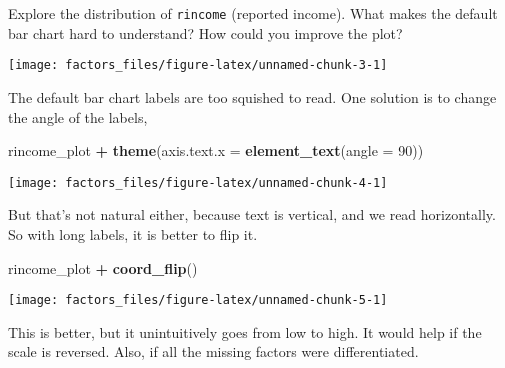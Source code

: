 \documentclass[]{book}
\newenvironment{Shaded}{\begin{snugshade}}{\end{snugshade}}
\newcommand{\DataTypeTok}[1]{\textcolor[rgb]{0.13,0.29,0.53}{#1}}
\newcommand{\DecValTok}[1]{\textcolor[rgb]{0.00,0.00,0.81}{#1}}
\newcommand{\KeywordTok}[1]{\textcolor[rgb]{0.13,0.29,0.53}{\textbf{#1}}}
\newcommand{\NormalTok}[1]{#1}
\newcommand{\OperatorTok}[1]{\textcolor[rgb]{0.81,0.36,0.00}{\textbf{#1}}}
\newcommand{\StringTok}[1]{\textcolor[rgb]{0.31,0.60,0.02}{#1}}
\theoremstyle{plain}
\theoremstyle{remark}
\begin{document}
Explore the distribution of \texttt{rincome} (reported income). What
makes the default bar chart hard to understand? How could you improve
the plot?

\begin{Shaded}
\end{Shaded}

\begin{center}\texttt{[image: factors\_files/figure-latex/unnamed-chunk-3-1]} \end{center}

The default bar chart labels are too squished to read. One solution is
to change the angle of the labels,

\begin{Shaded}
\begin{Highlighting}[]
\NormalTok{rincome_plot }\OperatorTok{+}
\StringTok{  }\KeywordTok{theme}\NormalTok{(}\DataTypeTok{axis.text.x =} \KeywordTok{element_text}\NormalTok{(}\DataTypeTok{angle =} \DecValTok{90}\NormalTok{))}
\end{Highlighting}
\end{Shaded}

\begin{center}\texttt{[image: factors\_files/figure-latex/unnamed-chunk-4-1]} \end{center}

But that's not natural either, because text is vertical, and we read
horizontally. So with long labels, it is better to flip it.

\begin{Shaded}
\begin{Highlighting}[]
\NormalTok{rincome_plot }\OperatorTok{+}
\StringTok{  }\KeywordTok{coord_flip}\NormalTok{()}
\end{Highlighting}
\end{Shaded}

\begin{center}\texttt{[image: factors\_files/figure-latex/unnamed-chunk-5-1]} \end{center}

This is better, but it unintuitively goes from low to high. It would
help if the scale is reversed. Also, if all the missing factors were
differentiated.
\end{document}
